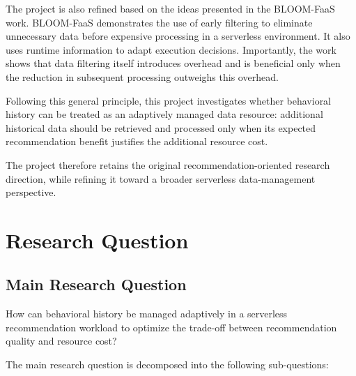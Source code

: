 \documentclass[12pt,a4paper]{article}
\begin{document}
The project is also refined based on the ideas presented in the BLOOM-FaaS work. BLOOM-FaaS demonstrates the use of early filtering to eliminate unnecessary data before expensive processing in a serverless environment. It also uses runtime information to adapt execution decisions. Importantly, the work shows that data filtering itself introduces overhead and is beneficial only when the reduction in subsequent processing outweighs this overhead.

Following this general principle, this project investigates whether behavioral history can be treated as an adaptively managed data resource: additional historical data should be retrieved and processed only when its expected recommendation benefit justifies the additional resource cost.

The project therefore retains the original recommendation-oriented research direction, while refining it toward a broader serverless data-management perspective.

\section{Research Question}

\subsection*{Main Research Question}
How can behavioral history be managed adaptively in a serverless recommendation workload to optimize the trade-off between recommendation quality and resource cost?

The main research question is decomposed into the following sub-questions:
\end{document}
